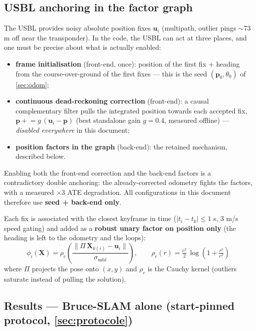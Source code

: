 \subsection{USBL anchoring in the factor graph}
\label{sec:usbl}

The USBL provides noisy absolute position fixes $\mathbf{u}_i$ (multipath, outlier
pings $\sim$73 m off near the transponder). In the code, the USBL can act at three
places, and one must be precise about what is actually enabled:
\begin{itemize}
\item \textbf{frame initialisation} (front-end, once): position of the first fix +
  heading from the course-over-ground of the first fixes — this is the seed
  $(\mathbf{p}_0, \theta_0)$ of \autoref{sec:odom};
\item \textbf{continuous dead-reckoning correction} (front-end): a causal
  complementary filter pulls the integrated position towards each accepted fix,
  $\mathbf{p} \mathrel{+}= g\,(\mathbf{u}_i - \mathbf{p})$ (best standalone gain
  $g = 0.4$, measured offline) — \emph{disabled everywhere} in this document;
\item \textbf{position factors in the graph} (back-end): the retained mechanism,
  described below.
\end{itemize}
Enabling both the front-end correction and the back-end factors is a contradictory
double anchoring: the already-corrected odometry fights the factors, with a measured
$\times 3$ ATE degradation. All configurations in this document therefore use
\textbf{seed + back-end only}.

Each fix is associated with the closest keyframe in time ($|t_i - t_k| \le 1$ s,
3 m/s speed gating) and added as a \textbf{robust unary factor on position only}
(the heading is left to the odometry and the loops):
\begin{equation}
\phi_i(\mathbf{X}) = \rho_c\!\left(\frac{\lVert \Pi\,\mathbf{X}_{k(i)} - \mathbf{u}_i \rVert}{\sigma_{\text{usbl}}}\right),
\qquad \rho_c(r) = \tfrac{c^2}{2}\,\log\!\left(1 + \tfrac{r^2}{c^2}\right)
\end{equation}
where $\Pi$ projects the pose onto $(x, y)$ and $\rho_c$ is the Cauchy kernel
(outliers saturate instead of pulling the solution).

\subsection{Results — Bruce-SLAM alone (start-pinned protocol, \autoref{sec:protocole})}
\label{sec:chap1-res}

